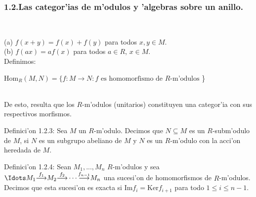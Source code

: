 \documentclass[10pt]{beamer}
\renewcommand{\ri}{\textit{R}}
\begin{document}
\begin{frame}
\frametitle{1.2.Las categor'ias de m'odulos y 'algebras sobre un anillo.}\\
\begin{block}{}
(a) $f(x+y)=f(x)+f(y)$ para todos $x,y \in M$.\\
(b) $f(ax)=af(x)$ para todos $a \in \ri$, $x \in M$.\\
Definimos:
\begin{center}
$\text{Hom}_{\ri} (M,N)=\{ f:M \rightarrow N: f\text{ es homomorfismo de }\ri\text{-m'odulos}$ \}
\end{center}
\\
De esto, resulta que los $\ri$-m'odulos (unitarios) constituyen una categor'ia con sus respectivos morfismos.\\
\end{block}
\begin{block}{Definici'on 1.2.3:}
Sea $M$ un $\ri$-m'odulo. Decimos que $N\subseteq M$ es un $\ri$-subm'odulo de $M$, si $N$ es un subgrupo abeliano de $M$ y $N$ es un $R$-m'odulo con la acci'on heredada de $M$.\\
\end{block}
\begin{block}{Definici'on 1.2.4:} 
Sean $M_1,...,M_n$ $R$-m'odulos y sea $\displaystyle \Idots M_1 {\overset{f_1}\longrightarrow} M_2 {\overset{f_2}{\longrightarrow}} \cdots {\overset{f_{n-1}}{\longrightarrow}} M_n$ una sucesi'on de homomorfismos de $R$-m'odulos. Decimos que esta sucesi'on es exacta si $\text{Im}f_{i}=\text{Ker} f_{i+1}$ para todo $1 \leq i \leq n-1$.\\
\end{block}
\end{frame}
\end{document}
